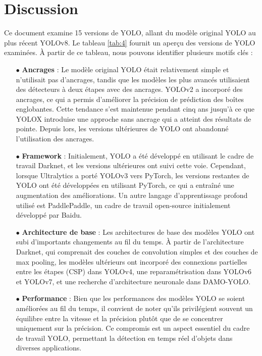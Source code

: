 \documentclass{article}
\begin{document}
\section{Discussion}

Ce document examine 15 versions de YOLO, allant du modèle original YOLO au plus récent YOLOv8. Le tableau \ref{tab:4} fournit un aperçu des versions de YOLO examinées. À partir de ce tableau, nous pouvons identifier plusieurs motifs clés :

\begin{itemize}
    \item[$\bullet$] \textbf{Ancrages} : Le modèle original YOLO était relativement simple et n'utilisait pas d'ancrages, tandis que les modèles les plus avancés utilisaient des détecteurs à deux étapes avec des ancrages. YOLOv2 a incorporé des ancrages, ce qui a permis d'améliorer la précision de prédiction des boîtes englobantes. Cette tendance s'est maintenue pendant cinq ans jusqu'à ce que YOLOX introduise une approche sans ancrage qui a atteint des résultats de pointe. Depuis lors, les versions ultérieures de YOLO ont abandonné l'utilisation des ancrages.
    \item[$\bullet$] \textbf{Framework} : Initialement, YOLO a été développé en utilisant le cadre de travail Darknet, et les versions ultérieures ont suivi cette voie. Cependant, lorsque Ultralytics a porté YOLOv3 vers PyTorch, les versions restantes de YOLO ont été développées en utilisant PyTorch, ce qui a entraîné une augmentation des améliorations. Un autre langage d'apprentissage profond utilisé est PaddlePaddle, un cadre de travail open-source initialement développé par Baidu.
    \item[$\bullet$]\textbf{ Architecture de base} : Les architectures de base des modèles YOLO ont subi d'importants changements au fil du temps. À partir de l'architecture Darknet, qui comprenait des couches de convolution simples et des couches de max pooling, les modèles ultérieurs ont incorporé des connexions partielles entre les étapes (CSP) dans YOLOv4, une reparamétrisation dans YOLOv6 et YOLOv7, et une recherche d'architecture neuronale dans DAMO-YOLO.
    \item[$\bullet$] \textbf{Performance} : Bien que les performances des modèles YOLO se soient améliorées au fil du temps, il convient de noter qu'ils privilégient souvent un équilibre entre la vitesse et la précision plutôt que de se concentrer uniquement sur la précision. Ce compromis est un aspect essentiel du cadre de travail YOLO, permettant la détection en temps réel d'objets dans diverses applications.
\end{itemize}
\end{document}
